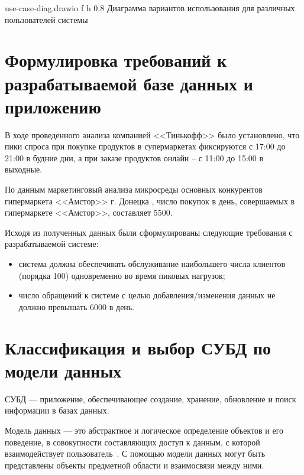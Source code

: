 {use-case-diag.drawio} %
{f} %
{h} %
{0.8\textwidth} %
{Диаграмма вариантов использования для различных пользователей системы} %

\clearpage

\section{Формулировка требований к разрабатываемой базе данных и приложению}

В ходе проведенного анализа компанией <<Тинькофф>> \cite{info_time_of_purchase} было установлено, что пики спроса при покупке продуктов в супермаркетах фиксируются с 17:00 до 21:00 в будние дни, а при заказе продуктов онлайн -- с 11:00 до 15:00 в выходные.

По данным маркетинговый анализа микросреды основных конкурентов гипермаркета <<Амстор>> г. Донецка \cite{info_marketing_aspects}, число покупок в день, совершаемых в гипермаркете <<Амстор>>, составляет 5500.

Исходя из полученных данных были сформулированы следующие требования с разрабатываемой системе:

\begin{itemize}[label*=--]
	\item система должна обеспечивать обслуживание наибольшего числа клиентов (порядка 100) одновременно во время пиковых нагрузок;
	\item число обращений к системе с целью добавления/изменения данных не должно превышать 6000 в день.
\end{itemize}


\section{Классификация и выбор СУБД по модели данных}

СУБД --- приложение, обеспечивающее создание, хранение, обновление и поиск информации в базах данных.

Модель данных --- это абстрактное и логическое определение объектов и его поведение, в совокупности составляющих доступ к данным, с которой взаимодействует пользователь~\cite{info_intro_db_williams}. С помощью модели данных могут быть представлены объекты предметной области и взаимосвязи между ними.

